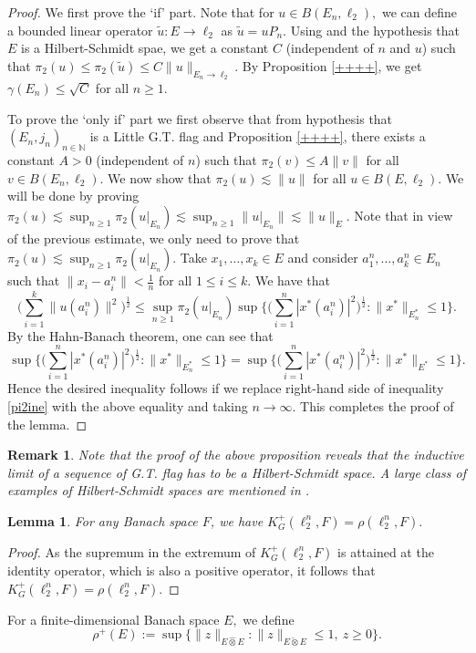 \documentclass[a4paper,oneside,11pt, reqno]{amsart}
\numberwithin{equation}{section}
\newtheorem{lemma}[theorem]{Lemma}
\newtheorem{remark}[theorem]{Remark}
\theoremstyle{plain}
\begin{document}
\begin{proof}
We first prove the `if' part. Note that for $u\in B(E_n,\ell_2),$ we can define a bounded linear operator $\tilde{u}:E\to\ell_2$  as $\tilde{u}=uP_n.$ Using \cite[Chapter 1, Page 9]{Pisier-factorization} and the hypothesis that $E$ is a Hilbert-Schmidt spae, we get a constant $C$ (independent of $n$ and $u$) such that $\pi_2(u)\leq\pi_2(\tilde{u})\leq C\|u\|_{E_n\to\ell_2}.$ 
By Proposition \ref{++++}, we get
 $\gamma(E_n)\leq \sqrt{C}$ for all $n\geq 1.$

To prove the `only if' part we first observe that from hypothesis that $(E_n,j_n)_{n\in\mathbb N}$ is a Little G.T. flag and Proposition \ref{++++}, there exists a constant $A>0$ (independent of $n$) such that $\pi_2(v)\leq A\|v\|$ for all $v\in B(E_n,\ell_2).$ We now show that $\pi_2(u)\lesssim\|u\|$ for all $u\in B(E,\ell_2).$ We will be done by proving $\pi_2(u)\lesssim \sup_{n\geq 1}\pi_2(u{|}_{E_n})\lesssim\sup_{n\geq 1}\|u{|}_{E_n}\|\lesssim\|u\|_E.$ Note that in view of the previous estimate, we only need to prove that $\pi_2(u)\lesssim \sup_{n\geq 1}\pi_2(u{|}_{E_n}).$ Take $x_1,\dots,x_k\in E$ and consider $a_1^n,\dots,a_k^n\in E_n$ such that $\|x_i-a_i^n\|<\frac{1}{n}$ for all $1\leq i\leq k.$  We have that 
\begin{equation}\label{pi2ine}
    \Big(\sum_{i=1}^k\|u(a_i^n)\|^2\Big)^{\frac{1}{2}}\leq \sup_{n\geq 1}\pi_2(u{|}_{E_n})\sup\Big\{\Big(\sum_{i=1}^n|x^*(a_i^n)|^2\Big)^{\frac{1}{2}}:\|x^*\|_{E_n^*}\leq 1\Big\}.
\end{equation}
By the Hahn-Banach theorem, one can see that
\[\sup\Big\{\Big(\sum_{i=1}^n|x^*(a_i^n)|^2\Big)^{\frac{1}{2}}:\|x^*\|_{E_n^*}\leq 1\Big\}=\sup\Big\{\Big(\sum_{i=1}^n|x^*(a_i^n)|^2\Big)^{\frac{1}{2}}:\|x^*\|_{E^*}\leq 1\Big\}.\]
Hence the desired inequality follows if we replace right-hand side of inequality \eqref{pi2ine} with the above equality and taking $n\to\infty.$ This completes the proof of the lemma.
\end{proof}
\begin{remark}\label{nxampl}
Note that the proof of the above proposition reveals that  the inductive limit of a sequence of G.T. flag has to be a Hilbert-Schmidt space. A large class of examples of Hilbert-Schmidt spaces are mentioned in \cite{Jarchow82}.
\end{remark}
\begin{lemma}
For any Banach space $F$, we have $K_G^+(\ell_2^n,F)=\rho(\ell_2^n,F).$
\end{lemma}
\begin{proof}
As the supremum in the extremum of $K_G^+(\ell_2^n,F)$ is attained at the identity operator, which is also a positive operator, it follows that $K_G^+(\ell_2^n,F)=\rho(\ell_2^n,F).$
\end{proof}
For a finite-dimensional Banach space $E,$ we define \[\rho^{+}(E):=\sup\{\|z\|_{E\hat{\otimes}E}:\|z\|_{E\check{\otimes}E}\leqslant 1,\ z\geqslant 0\}.\]
\end{document}
